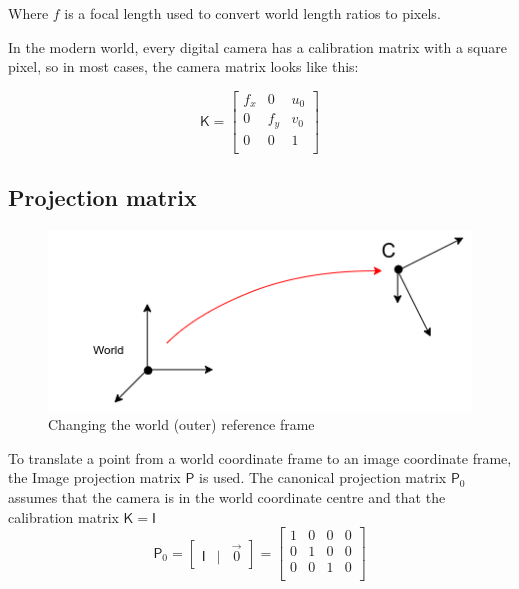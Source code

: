 Where $f$ is a focal length used to convert world length ratios to pixels.

In the modern world, every digital camera has a calibration matrix with a square pixel, so in most cases, the camera matrix looks like this:

\begin{equation}
    \label{eq:kmat}
    \pmb{\mathsf{K}} = \begin{bmatrix}
        f_x & 0 & u_0 \\
        0 & f_y & v_0 \\
        0 & 0 & 1 \\
    \end{bmatrix}    
\end{equation}

\subsection{Projection matrix}

\begin{figure}[h]
    \centering
    \includegraphics[width=.5\textwidth]{graphics/frames.png}
    \caption{Changing the world (outer) reference frame}
    \label{fig:frames}
\end{figure}

To translate a point from a world coordinate frame to an image coordinate frame, the Image projection matrix $\pmb{\mathsf{P}}$ is used. 
The canonical projection matrix $\pmb{\mathsf{P}}_0$ assumes that the camera is in the world coordinate centre and that the calibration matrix $\pmb{\mathsf{K}} = \pmb{\mathsf{I}}$
\begin{equation}
\pmb{\mathsf{P}}_0 = \begin{bmatrix} \pmb{\mathsf{I}} & | & \vec{0} \end{bmatrix} = 
    \begin{bmatrix}
    1 & 0 & 0 & 0 \\
    0 & 1 & 0 & 0 \\
    0 & 0 & 1 & 0 \\
    \end{bmatrix}    
\end{equation}

